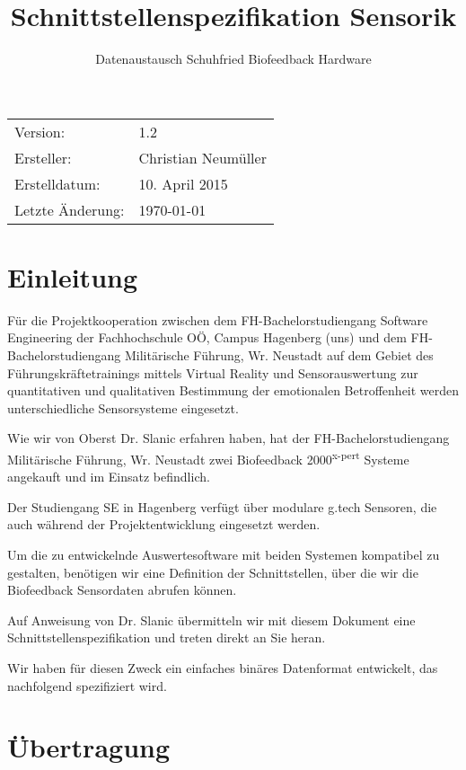 \documentclass[a4paper,parskip=full,oneside]{scrartcl}
\title{Schnittstellenspezifikation Sensorik}
\subtitle{Datenaustausch Schuhfried Biofeedback Hardware}
\date{\vspace{-2\baselineskip}}
\begin{document}
\maketitle

\begin{center}
\begin{tabular}{ll}
Version: & 1.2 \\
Ersteller: & Christian Neumüller \\
Erstelldatum: & 10. April 2015 \\
Letzte Änderung: & \today \\
\end{tabular}
\end{center}
\bigskip
\tableofcontents

\pagebreak
\section{Einleitung}
Für die Projektkooperation zwischen dem FH-Bachelorstudiengang Software
Engineering der Fachhochschule OÖ, Campus Hagenberg (uns) und dem
FH-Bachelorstudiengang Militärische Führung, Wr. Neustadt auf dem Gebiet
des Führungskräftetrainings mittels Virtual Reality und Sensorauswertung zur
quantitativen und qualitativen Bestimmung der emotionalen Betroffenheit werden
unterschiedliche Sensorsysteme eingesetzt.

Wie wir von Oberst Dr. Slanic erfahren haben, hat der FH-Bachelorstudiengang
Militärische Führung, Wr. Neustadt zwei Biofeedback 2000\textsuperscript{x-pert} Systeme
angekauft und im Einsatz befindlich.

Der Studiengang SE in Hagenberg verfügt über modulare g.tech Sensoren, die auch während
der Projektentwicklung eingesetzt werden.

Um die zu entwickelnde Auswertesoftware mit beiden Systemen kompatibel zu gestalten,
benötigen wir eine Definition der Schnittstellen, über die wir die Biofeedback Sensordaten
abrufen können.

Auf Anweisung von Dr. Slanic übermitteln wir mit diesem Dokument eine Schnittstellenspezifikation
und treten direkt an Sie heran.

Wir haben für diesen Zweck ein einfaches binäres Datenformat entwickelt,
das nachfolgend spezifiziert wird.

\section{Übertragung}
\end{document}
